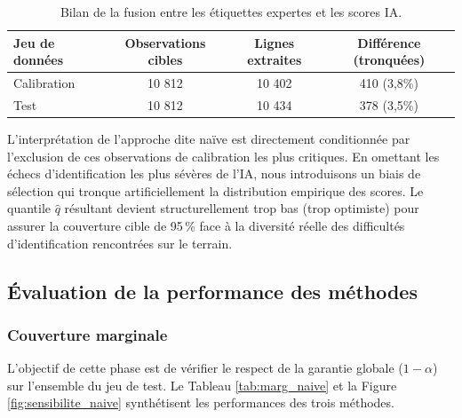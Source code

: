 \documentclass[12pt,a4paper]{article}
\begin{document}
\begin{table}[H]
\centering
\small
\renewcommand{\arraystretch}{1.2}
\begin{tabular}{|l|c|c|c|}
\hline
\textbf{Jeu de données} & \textbf{Observations cibles} & \textbf{Lignes extraites} & \textbf{Différence (tronquées)} \\
\hline
Calibration & 10 812 & 10 402 & 410 (3,8\%) \\
Test        & 10 812 & 10 434 & 378 (3,5\%) \\
\hline
\end{tabular}
\caption{Bilan de la fusion entre les étiquettes expertes et les scores IA.}
\label{tab:bilan_fusion}
\end{table}

L'interprétation de l'approche dite naïve est directement conditionnée par l'exclusion de ces observations de calibration les plus critiques. En omettant les échecs d'identification les plus sévères de l'IA, nous introduisons un biais de sélection qui tronque artificiellement la distribution empirique des scores. Le quantile $\hat{q}$ résultant devient structurellement trop bas (trop optimiste) pour assurer la couverture cible de 95\,\% face à la diversité réelle des difficultés d'identification rencontrées sur le terrain.



\subsection{Évaluation de la performance des méthodes}

\subsubsection{Couverture marginale}
L'objectif de cette phase est de vérifier le respect de la garantie globale ($1-\alpha$) sur l'ensemble du jeu de test. Le Tableau \ref{tab:marg_naive} et la Figure \ref{fig:sensibilite_naive} synthétisent les performances des trois méthodes.
\end{document}
